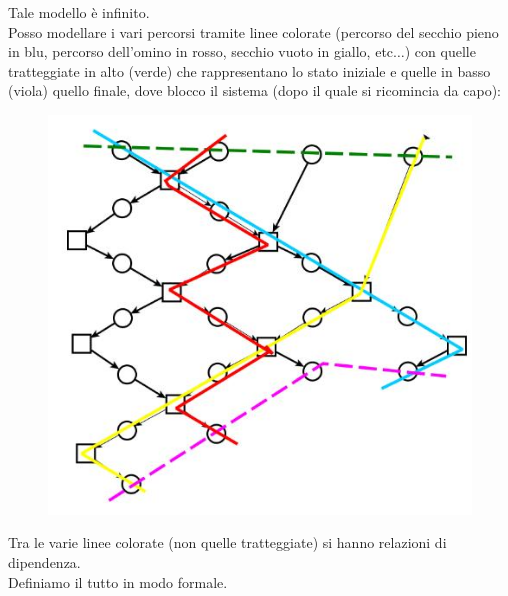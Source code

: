 \documentclass[a4paper,12pt, oneside]{book}
\begin{document}
Tale modello è infinito.\\
\newpage
Posso modellare i vari percorsi tramite linee colorate (percorso del secchio
pieno in blu, percorso dell'omino in rosso, secchio vuoto in giallo,
etc$\ldots$) con quelle tratteggiate 
in alto (verde) che rappresentano lo stato iniziale e quelle in basso (viola)
quello finale, dove blocco il sistema
(dopo il quale si ricomincia da capo):
\begin{figure}[H]
  \centering
  \includegraphics[scale = 0.5]{img/inc3.jpg} 
\end{figure}
Tra le varie linee colorate (non quelle tratteggiate) si hanno relazioni di
dipendenza. \\
Definiamo il tutto in modo formale.
\end{document}
